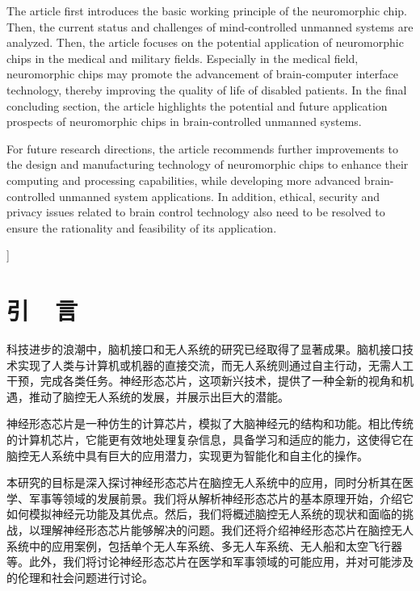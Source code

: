 \documentclass{thuemp}
\begin{document}
\begin{@twocolumnfalse}
\begin{empAbstractEn}
  The article first introduces the basic working principle of the neuromorphic chip. Then, the current status and challenges of mind-controlled unmanned systems are analyzed. Then, the article focuses on the potential application of neuromorphic chips in the medical and military fields. Especially in the medical field, neuromorphic chips may promote the advancement of brain-computer interface technology, thereby improving the quality of life of disabled patients. In the final concluding section, the article highlights the potential and future application prospects of neuromorphic chips in brain-controlled unmanned systems.
 
  For future research directions, the article recommends further improvements to the design and manufacturing technology of neuromorphic chips to enhance their computing and processing capabilities, while developing more advanced brain-controlled unmanned system applications. In addition, ethical, security and privacy issues related to brain control technology also need to be resolved to ensure the rationality and feasibility of its application.
\end{empAbstractEn}

\end{@twocolumnfalse}
]
\wuhao 

\section{引~~言}
科技进步的浪潮中，脑机接口和无人系统的研究已经取得了显著成果。脑机接口技术实现了人类与计算机或机器的直接交流，而无人系统则通过自主行动，无需人工干预，完成各类任务。神经形态芯片，这项新兴技术，提供了一种全新的视角和机遇，推动了脑控无人系统的发展，并展示出巨大的潜能。

神经形态芯片是一种仿生的计算芯片，模拟了大脑神经元的结构和功能。相比传统的计算机芯片，它能更有效地处理复杂信息，具备学习和适应的能力，这使得它在脑控无人系统中具有巨大的应用潜力，实现更为智能化和自主化的操作。

本研究的目标是深入探讨神经形态芯片在脑控无人系统中的应用，同时分析其在医学、军事等领域的发展前景。我们将从解析神经形态芯片的基本原理开始，介绍它如何模拟神经元功能及其优点。然后，我们将概述脑控无人系统的现状和面临的挑战，以理解神经形态芯片能够解决的问题。我们还将介绍神经形态芯片在脑控无人系统中的应用案例，包括单个无人车系统、多无人车系统、无人船和太空飞行器等。此外，我们将讨论神经形态芯片在医学和军事领域的可能应用，并对可能涉及的伦理和社会问题进行讨论。
\end{document}
